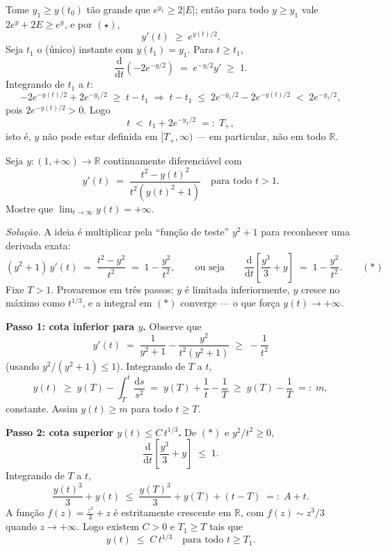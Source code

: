 \documentclass[10pt,a4paper]{amsart}
\newcommand{\R}{\mathbb{R}}
\renewcommand{\d}{\mathrm{d}}
\begin{document}
\begin{enumerate}[label=(\alph*)]
    Tome $y_1 \geq y(t_0)$ tão grande que $e^{y_1} \geq 2 |E|$; então para todo $y \geq y_1$ vale $2 e^y + 2 E \geq e^y$, e por $(\star)$,
    \[
        y'(t) \;\geq\; e^{y(t)/2}.
    \]
    Seja $t_1$ o (único) instante com $y(t_1) = y_1$. Para $t \geq t_1$,
    \[
        \frac{\d}{\d t}\!\left( -2 e^{- y / 2} \right) \;=\; e^{- y / 2} y' \;\geq\; 1.
    \]
    Integrando de $t_1$ a $t$:
    \[
        -2 e^{- y(t) / 2} + 2 e^{- y_1 / 2} \;\geq\; t - t_1
        \;\Longrightarrow\; t - t_1 \;\leq\; 2 e^{- y_1 / 2} - 2 e^{- y(t)/2} \;<\; 2 e^{- y_1 / 2},
    \]
    pois $2 e^{- y(t) / 2} > 0$. Logo
    \[
        t \;<\; t_1 + 2 e^{- y_1 / 2} \;=:\; T_+,
    \]
    isto é, $y$ não pode estar definida em $[T_+, \infty)$ — em particular, não em todo $\R$.
\end{enumerate}

\vspace{5mm}

 Seja $y : (1, +\infty) \to \R$ continuamente diferenciável com
\[
    y'(t) \;=\; \frac{t^2 - y(t)^2}{t^2 (y(t)^2 + 1)} \quad \text{para todo } t > 1.
\]
Mostre que $\lim_{t \to \infty} y(t) = +\infty$.

\emph{Solução.} A ideia é multiplicar pela ``função de teste'' $y^2 + 1$ para reconhecer uma derivada exata:
\[
    (y^2 + 1)\, y'(t) \;=\; \frac{t^2 - y^2}{t^2} \;=\; 1 - \frac{y^2}{t^2}, \qquad
    \text{ou seja} \qquad
    \frac{\d}{\d t}\!\left[ \frac{y^3}{3} + y \right] \;=\; 1 - \frac{y^2}{t^2}. \qquad (\ast)
\]
Fixe $T > 1$. Provaremos em três passos: $y$ é limitada inferiormente, $y$ cresce no máximo como $t^{1/3}$, e a integral em $(\ast)$ converge --- o que força $y(t) \to +\infty$.

\smallskip

\noindent \textbf{Passo 1: cota inferior para $y$.} Observe que
\[
    y'(t) \;=\; \frac{1}{y^2 + 1} - \frac{y^2}{t^2 (y^2 + 1)} \;\geq\; -\frac{1}{t^2}
\]
(usando $y^2 / (y^2 + 1) \leq 1$). Integrando de $T$ a $t$,
\[
    y(t) \;\geq\; y(T) - \int_T^t \frac{\d s}{s^2} \;=\; y(T) + \frac{1}{t} - \frac{1}{T} \;\geq\; y(T) - \frac{1}{T} \;=:\; m,
\]
constante. Assim $y(t) \geq m$ para todo $t \geq T$.

\smallskip

\noindent \textbf{Passo 2: cota superior $y(t) \leq C\, t^{1/3}$.} De $(\ast)$ e $y^2/t^2 \geq 0$,
\[
    \frac{\d}{\d t}\!\left[ \frac{y^3}{3} + y \right] \;\leq\; 1.
\]
Integrando de $T$ a $t$,
\[
    \frac{y(t)^3}{3} + y(t) \;\leq\; \frac{y(T)^3}{3} + y(T) + (t - T) \;=:\; A + t.
\]
A função $f(z) = \tfrac{z^3}{3} + z$ é estritamente crescente em $\R$, com $f(z) \sim z^3 / 3$ quando $z \to +\infty$. Logo existem $C > 0$ e $T_1 \geq T$ tais que
\[
    y(t) \;\leq\; C\, t^{1/3} \quad \text{para todo } t \geq T_1.
\]
\end{document}
